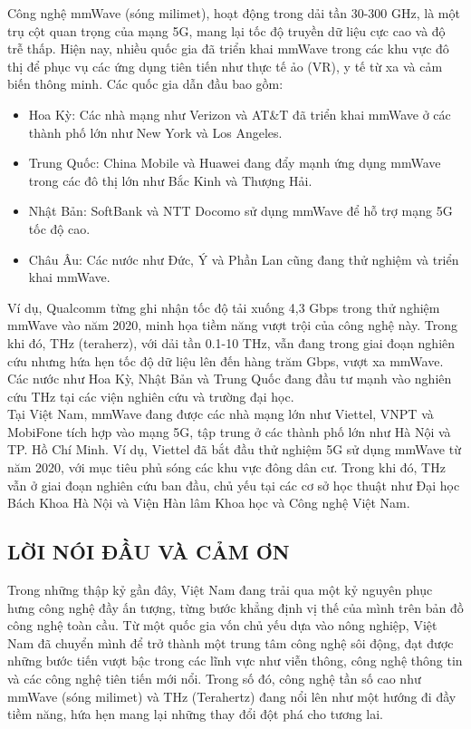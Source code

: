 \documentclass[a4paper,13pt]{article}
\begin{document}
Công nghệ mmWave (sóng milimet), hoạt động trong dải tần 30-300 GHz, là một trụ cột quan trọng của mạng 5G, mang lại tốc độ truyền dữ liệu cực cao và độ trễ thấp. Hiện nay, nhiều quốc gia đã triển khai mmWave trong các khu vực đô thị để phục vụ các ứng dụng tiên tiến như thực tế ảo (VR), y tế từ xa và cảm biến thông minh. Các quốc gia dẫn đầu bao gồm: \\
\begin{itemize}
    \item Hoa Kỳ: Các nhà mạng như Verizon và AT&T đã triển khai mmWave ở các thành phố lớn như New York và Los Angeles.
    \item Trung Quốc: China Mobile và Huawei đang đẩy mạnh ứng dụng mmWave trong các đô thị lớn như Bắc Kinh và Thượng Hải.
    \item Nhật Bản: SoftBank và NTT Docomo sử dụng mmWave để hỗ trợ mạng 5G tốc độ cao.
    \item Châu Âu: Các nước như Đức, Ý và Phần Lan cũng đang thử nghiệm và triển khai mmWave.
\end{itemize}
Ví dụ, Qualcomm từng ghi nhận tốc độ tải xuống 4,3 Gbps trong thử nghiệm mmWave vào năm 2020, minh họa tiềm năng vượt trội của công nghệ này. Trong khi đó, THz (teraherz), với dải tần 0.1-10 THz, vẫn đang trong giai đoạn nghiên cứu nhưng hứa hẹn tốc độ dữ liệu lên đến hàng trăm Gbps, vượt xa mmWave. Các nước như Hoa Kỳ, Nhật Bản và Trung Quốc đang đầu tư mạnh vào nghiên cứu THz tại các viện nghiên cứu và trường đại học.\\

Tại Việt Nam, mmWave đang được các nhà mạng lớn như Viettel, VNPT và MobiFone tích hợp vào mạng 5G, tập trung ở các thành phố lớn như Hà Nội và TP. Hồ Chí Minh. Ví dụ, Viettel đã bắt đầu thử nghiệm 5G sử dụng mmWave từ năm 2020, với mục tiêu phủ sóng các khu vực đông dân cư. Trong khi đó, THz vẫn ở giai đoạn nghiên cứu ban đầu, chủ yếu tại các cơ sở học thuật như Đại học Bách Khoa Hà Nội và Viện Hàn lâm Khoa học và Công nghệ Việt Nam.
\vspace{2cm}
\clearpage  
\begin{center}
\section{LỜI NÓI ĐẦU VÀ CẢM ƠN }
\end{center}

Trong những thập kỷ gần đây, Việt Nam đang trải qua một kỷ nguyên phục hưng công nghệ đầy ấn tượng, từng bước khẳng định vị thế của mình trên bản đồ công nghệ toàn cầu. Từ một quốc gia vốn chủ yếu dựa vào nông nghiệp, Việt Nam đã chuyển mình để trở thành một trung tâm công nghệ sôi động, đạt được những bước tiến vượt bậc trong các lĩnh vực như viễn thông, công nghệ thông tin và các công nghệ tiên tiến mới nổi. Trong số đó, công nghệ tần số cao như mmWave (sóng milimet) và THz (Terahertz) đang nổi lên như một hướng đi đầy tiềm năng, hứa hẹn mang lại những thay đổi đột phá cho tương lai.\\
\end{document}
